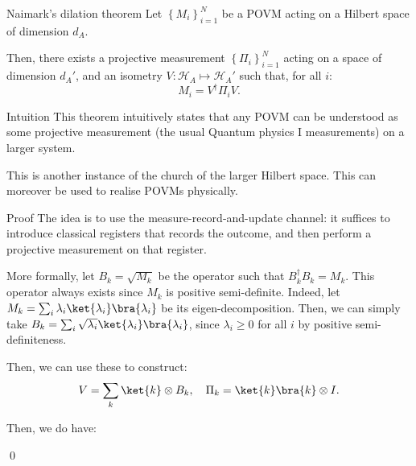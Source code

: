 \documentclass[a4paper]{article}
\begin{document}
\begin{parag}{Naimark's dilation theorem}
    Let $\left\{M_i\right\}_{i=1}^N$ be a POVM acting on a Hilbert space of dimension $d_A$.

    Then, there exists a projective measurement $\left\{\Pi_i\right\}_{i=1}^N$ acting on a space of dimension $d_A'$, and an isometry $V: \mathcal{H}_A \mapsto \mathcal{H}_A'$ such that, for all $i$: 
    \[M_i = V^{\dagger} \Pi_i V.\]
    
    \begin{subparag}{Intuition}
        This theorem intuitively states that any POVM can be understood as some projective measurement (the usual Quantum physics I measurements) on a larger system.

        This is another instance of the church of the larger Hilbert space. This can moreover be used to realise POVMs physically.
    \end{subparag}

    \begin{subparag}{Proof}
        The idea is to use the measure-record-and-update channel: it suffices to introduce classical registers that records the outcome, and then perform a projective measurement on that register. 

        More formally, let $B_k = \sqrt{M_k}$ be the operator such that $B_k^{\dagger} B_k = M_k$. This operator always exists since $M_k$ is positive semi-definite. Indeed, let $M_k = \sum_{i} \lambda_i \ket{\lambda_i}\bra{\lambda_i}$ be its eigen-decomposition. Then, we can simply take $B_k = \sum_{i} \sqrt{\lambda_i} \ket{\lambda_i}\bra{\lambda_i}$, since $\lambda_i \geq 0$ for all $i$ by positive semi-definiteness.

        Then, we can use these to construct:
        \[V = \sum_{k} \ket{k} \otimes B_k, \mathspace \Pi_k = \ket{k}\bra{k} \otimes I.\]

        Then, we do have: 

        \qed
    \end{subparag}
\end{parag}
\end{document}
